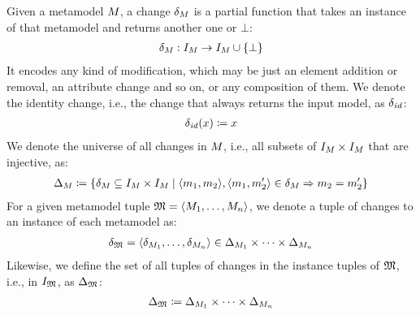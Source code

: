 \begin{definition}[Change]
    \label{def:change}
    Given a metamodel $\metamodel{M}{}$, a change $\change{\metamodel{M}{}}$ is a partial function that takes an instance of that metamodel and returns another one or $\bot$:
    \begin{align*}
        \change{\metamodel{M}{}}: \metamodelinstanceset{M}{} \rightarrow \metamodelinstanceset{M}{} \cup \setted{\bot}
    \end{align*}
    It encodes any kind of modification, which may be just an element addition or removal, an attribute change and so on, or any composition of them.
    We denote the identity change, i.e., the change that always returns the input model, as $\delta_{\mathit{id}}$:
    \begin{align*}
        \delta_{\mathit{id}}(x) \coloneqq x
    \end{align*}
    We denote the universe of all changes in $\metamodel{M}{}$, i.e., all subsets of $\metamodelinstanceset{M}{} \times \metamodelinstanceset{M}{}$ that are injective, as:
    \begin{align*}
        \changeuniverse{\metamodel{M}{}} \equalsperdefinition \setted{\change{\metamodel{M}{}} \subseteq \metamodelinstanceset{M}{} \times \metamodelinstanceset{M}{} \mid
        \tupled{\model{m}{1}, \model{m}{2}}, \tupled{\model{m}{1}, \model{m}{2}'} \in \change{\metamodel{M}{}} \Rightarrow \model{m}{2} = \model{m}{2}'}
    \end{align*}
    For a given metamodel tuple $\metamodeltuple{M} = \tupled{\metamodelsequence{M}{n}}$, we denote a tuple of changes to an instance of each metamodel as:
    \begin{align*}
        \changetuple{\metamodeltuple{M}} = \tupled{\change{\metamodel{M}{1}}, \dots, \change{\metamodel{M}{n}}} \in \changeuniverse{\metamodel{M}{1}} \times \dots \times \changeuniverse{\metamodel{M}{n}} %
    \end{align*}
    Likewise, we define the set of all tuples of changes in the instance tuples of 
    $\metamodeltuple{M}$, i.e., in $\metamodeltupleinstanceset{M}$, as $\changeuniverse{\metamodeltuple{M}}$:
    \begin{align*}
        \changeuniverse{\metamodeltuple{M}} \equalsperdefinition \changeuniverse{\metamodel{M}{1}} \times \dots \times \changeuniverse{\metamodel{M}{n}} %

\end{align*}
\end{definition}
